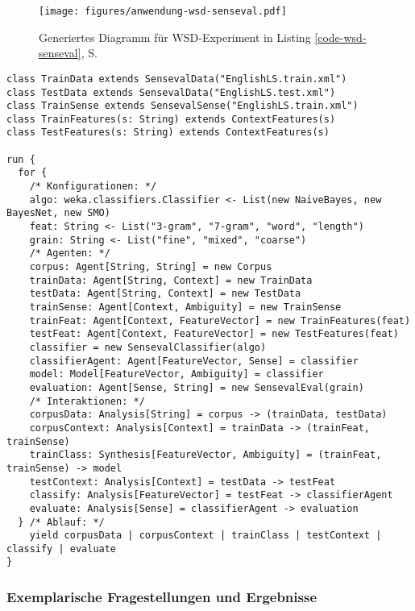 \documentclass[abstracton, 12pt]{scrartcl}
\begin{document}
\begin{figure}
\begin{center}
  \texttt{[image: figures/anwendung-wsd-senseval.pdf]}
  \caption{Generiertes Diagramm für WSD-Experiment in Listing \ref{code-wsd-senseval}, S. \pageref{code-wsd-senseval}}
  \label{anwendung-wsd-senseval}
\end{center}
\end{figure}

\begin{lstlisting}[float, label=code-wsd-senseval-annotated, caption={Explizit typisiertes WSD-Experiment, vgl. Listing \ref{code-wsd-senseval}, S. \pageref{code-wsd-senseval}}]
class TrainData extends SensevalData("EnglishLS.train.xml")
class TestData extends SensevalData("EnglishLS.test.xml")
class TrainSense extends SensevalSense("EnglishLS.train.xml")
class TrainFeatures(s: String) extends ContextFeatures(s)
class TestFeatures(s: String) extends ContextFeatures(s)

run {
  for {
    /* Konfigurationen: */
    algo: weka.classifiers.Classifier <- List(new NaiveBayes, new BayesNet, new SMO)
    feat: String <- List("3-gram", "7-gram", "word", "length")
    grain: String <- List("fine", "mixed", "coarse")
    /* Agenten: */
    corpus: Agent[String, String] = new Corpus
    trainData: Agent[String, Context] = new TrainData
    testData: Agent[String, Context] = new TestData
    trainSense: Agent[Context, Ambiguity] = new TrainSense
    trainFeat: Agent[Context, FeatureVector] = new TrainFeatures(feat)
    testFeat: Agent[Context, FeatureVector] = new TestFeatures(feat)
    classifier = new SensevalClassifier(algo)
    classifierAgent: Agent[FeatureVector, Sense] = classifier
    model: Model[FeatureVector, Ambiguity] = classifier
    evaluation: Agent[Sense, String] = new SensevalEval(grain)
    /* Interaktionen: */
    corpusData: Analysis[String] = corpus -> (trainData, testData)
    corpusContext: Analysis[Context] = trainData -> (trainFeat, trainSense)
    trainClass: Synthesis[FeatureVector, Ambiguity] = (trainFeat, trainSense) -> model
    testContext: Analysis[Context] = testData -> testFeat
    classify: Analysis[FeatureVector] = testFeat -> classifierAgent
    evaluate: Analysis[Sense] = classifierAgent -> evaluation
  } /* Ablauf: */ 
    yield corpusData | corpusContext | trainClass | testContext | classify | evaluate
}
\end{lstlisting}

\subsubsection{Exemplarische Fragestellungen und Ergebnisse} \label{appl-senseval-results}
\end{document}
